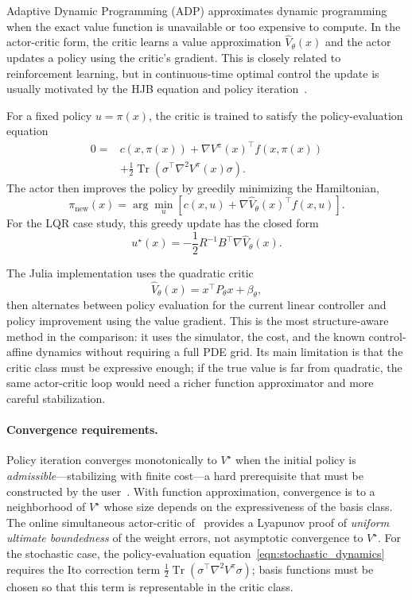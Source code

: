 Adaptive Dynamic Programming (ADP) approximates dynamic programming when the exact value function is unavailable or too expensive to compute. In the actor-critic form, the critic learns a value approximation $\hat V_\theta(x)$ and the actor updates a policy using the critic's gradient. This is closely related to reinforcement learning, but in continuous-time optimal control the update is usually motivated by the HJB equation and policy iteration~\cite{bertsekas1996neuro,sutton2018reinforcement}.

For a fixed policy $u=\pi(x)$, the critic is trained to satisfy the policy-evaluation equation
\begin{equation}
\begin{aligned}
0 ={}& c(x,\pi(x)) + \nabla V^\pi(x)^\top f(x,\pi(x))\\
&+ \frac{1}{2}\operatorname{Tr}\left(\sigma^\top \nabla^2 V^\pi(x)\sigma\right).
\end{aligned}
\end{equation}
The actor then improves the policy by greedily minimizing the Hamiltonian,
\begin{equation}
\pi_{\mathrm{new}}(x)=\arg\min_u
\left[c(x,u)+\nabla \hat V_\theta(x)^\top f(x,u)\right].
\end{equation}
For the LQR case study, this greedy update has the closed form
\begin{equation}
u^\star(x)=-\frac{1}{2}R^{-1}B^\top \nabla \hat V_\theta(x).
\end{equation}

The Julia implementation uses the quadratic critic
\begin{equation}
\hat V_\theta(x)=x^\top P_\theta x+\beta_\theta,
\end{equation}
then alternates between policy evaluation for the current linear controller and policy improvement using the value gradient. This is the most structure-aware method in the comparison: it uses the simulator, the cost, and the known control-affine dynamics without requiring a full PDE grid. Its main limitation is that the critic class must be expressive enough; if the true value is far from quadratic, the same actor-critic loop would need a richer function approximator and more careful stabilization.

\paragraph{Convergence requirements.}
Policy iteration converges monotonically to $V^\star$ when the initial policy
is \emph{admissible}---stabilizing with finite cost---a hard prerequisite that
must be constructed by the user~\cite{abu2005nearly}.
With function approximation, convergence is to a neighborhood of $V^\star$
whose size depends on the expressiveness of the basis class.
The online simultaneous actor-critic of~\cite{vamvoudakis2010online} provides
a Lyapunov proof of \emph{uniform ultimate boundedness} of the weight errors,
not asymptotic convergence to $V^\star$.
For the stochastic case, the policy-evaluation equation~\eqref{eqn:stochastic_dynamics}
requires the Ito correction term $\frac{1}{2}\operatorname{Tr}(\sigma^\top\nabla^2 V^\pi\sigma)$;
basis functions must be chosen so that this term is representable in the critic class.
